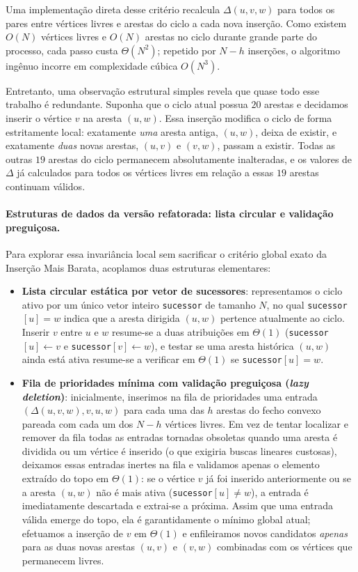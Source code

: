 Uma implementação direta desse critério recalcula $\Delta(u, v, w)$ para todos os pares entre
vértices livres e arestas do ciclo a cada nova inserção. Como existem $O(N)$ vértices livres e
$O(N)$ arestas no ciclo durante grande parte do processo, cada passo custa $\Theta(N^2)$;
repetido por $N - h$ inserções, o algoritmo ingênuo incorre em complexidade cúbica $O(N^3)$.

Entretanto, uma observação estrutural simples revela que quase todo esse trabalho é redundante.
Suponha que o ciclo atual possua $20$ arestas e decidamos inserir o vértice $v$ na aresta
$(u, w)$. Essa inserção modifica o ciclo de forma estritamente local: exatamente \emph{uma}
aresta antiga, $(u, w)$, deixa de existir, e exatamente \emph{duas} novas arestas, $(u, v)$ e
$(v, w)$, passam a existir. Todas as outras $19$ arestas do ciclo permanecem absolutamente
inalteradas, e os valores de $\Delta$ já calculados para todos os vértices livres em relação a
essas $19$ arestas continuam válidos.

\paragraph{Estruturas de dados da versão refatorada: lista circular e validação preguiçosa.}
Para explorar essa invariância local sem sacrificar o critério global exato da Inserção Mais
Barata, acoplamos duas estruturas elementares:
\begin{itemize}
  \item \textbf{Lista circular estática por vetor de sucessores}: representamos o ciclo ativo
  por um único vetor inteiro \texttt{sucessor} de tamanho $N$, no qual \texttt{sucessor}$[u] = w$
  indica que a aresta dirigida $(u, w)$ pertence atualmente ao ciclo. Inserir $v$ entre $u$ e
  $w$ resume-se a duas atribuições em $\Theta(1)$ (\texttt{sucessor}$[u] \leftarrow v$ e
  \texttt{sucessor}$[v] \leftarrow w$), e testar se uma aresta histórica $(u, w)$ ainda está
  ativa resume-se a verificar em $\Theta(1)$ se \texttt{sucessor}$[u] = w$.
  \item \textbf{Fila de prioridades mínima com validação preguiçosa (\textit{lazy deletion})}:
  inicialmente, inserimos na fila de prioridades uma entrada $(\Delta(u, v, w), v, u, w)$ para
  cada uma das $h$ arestas do fecho convexo pareada com cada um dos $N - h$ vértices livres.
  Em vez de tentar localizar e remover da fila todas as entradas tornadas obsoletas quando uma
  aresta é dividida ou um vértice é inserido (o que exigiria buscas lineares custosas),
  deixamos essas entradas inertes na fila e validamos apenas o elemento extraído do topo em
  $\Theta(1)$: se o vértice $v$ já foi inserido anteriormente ou se a aresta $(u, w)$ não é mais
  ativa (\texttt{sucessor}$[u] \ne w$), a entrada é imediatamente descartada e extrai-se a
  próxima. Assim que uma entrada válida emerge do topo, ela é garantidamente o mínimo global
  atual; efetuamos a inserção de $v$ em $\Theta(1)$ e enfileiramos novos candidatos
  \emph{apenas} para as duas novas arestas $(u, v)$ e $(v, w)$ combinadas com os vértices que
  permanecem livres.
\end{itemize}

